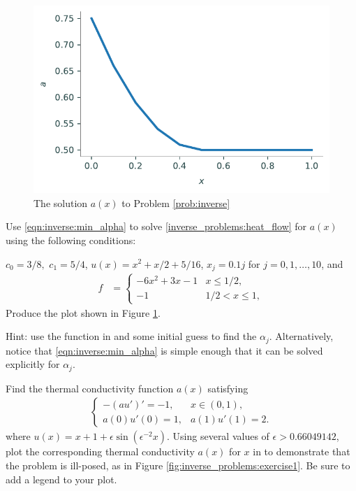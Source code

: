 \begin{figure}[H]
\centering
\includegraphics[width=\textwidth]{figures/density_a.pdf}
\caption{The solution $a(x)$ to Problem \ref{prob:inverse}}
\label{fig:inverse_problems:num1}
\end{figure}

\begin{problem}
Use \eqref{eqn:inverse:min_alpha} to solve \eqref{inverse_problems:heat_flow} for $a(x)$ using the following conditions:

\noindent $c_0 = 3/8,$ $c_1 = 5/4$, $u(x) = x^2 + x/2 + 5/16$, $x_j=0.1j$ for $j=0,1,\dots,10$, and 
\begin{align*}
	f &= \begin{cases}
		-6x^2 + 3x - 1 & x \leq 1/2,\\
		-1 & 1/2 < x \leq 1,
	\end{cases}
\end{align*}
Produce the plot shown in Figure \ref{fig:inverse_problems:num1}.

Hint: use the  function in  and some initial guess to find the $\alpha_j$.
 Alternatively, notice that \eqref{eqn:inverse:min_alpha} is simple enough that it can be solved explicitly for $\alpha_j$.
\label{prob:inverse}
\end{problem}

\begin{problem}
	Find the thermal conductivity function $a(x)$ satisfying 
	\begin{align}
	\begin{cases}
		-(au')' = -1, & x \in (0,1),\\
		a(0)u'(0) = 1, & a(1)u'(1) = 2.
	\end{cases} \label{inverse_problems:ill_posed}
	\end{align}
	where $u(x) = x + 1 + \epsilon \sin(\epsilon^{-2}x)$. 
Using several values of $\epsilon  > 0.66049142$, plot the corresponding thermal conductivity $a(x)$ for $x$ in  to demonstrate that the problem is ill-posed, as in Figure \ref{fig:inverse_problems:exercise1}.
Be sure to add a legend to your plot.
\end{problem}

